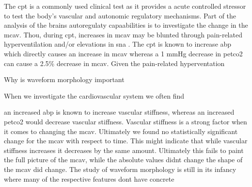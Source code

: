 The \gls{cpt} is a commonly used clinical test as it provides a acute controlled stressor to test the body's vascular and autonomic regulatory mechanisms. Part of the analysis of the brains autoregulaty capaabilities is to investigate the change in the \gls{mcav}. Thou, during \gls{cpt}, increases in \gls{mcav} may be blunted through pain-related hyperventilation and/or elevations in \gls{sna} \cite{elric}.
The \gls{cpt} is known to increase \gls{abp} which directly causes an increase in \gls{mcav} whereas a 1 mmHg decrease in \gls{petco2} can cause a 2.5\% decrease in \gls{mcav}. Given the pain-related hyperventation 


Why is waveform morphology important 

When we investigate the cardiovascular system we often find

an increased \gls{abp} is known to increase vascular stiffness, whereas an increased \gls{petco2} would decrease vascular stiffness. Vascular stiffness is a strong factor when it comes to changing the \gls{mcav}. Ultimately we found no statistically significant change for the \gls{mcav} with respect to time. This might indicate that while vascular stiffness increases it decreases by the same amount. Ultimately this fails to paint the full picture of the \gls{mcav}, while the absolute values didnt change the shape of the \gls{mcav} did change. The study of waveform morphology is still in its infancy where many of the respective features dont have concrete 